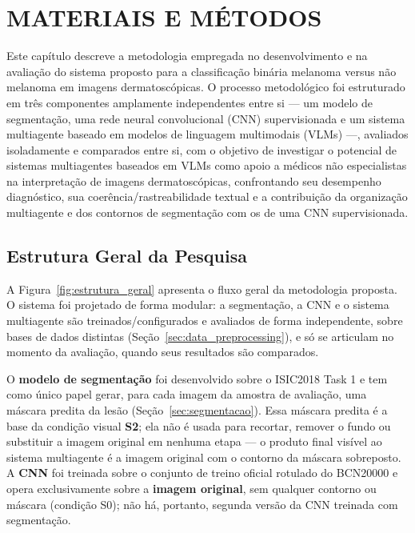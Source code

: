 
\chapter{MATERIAIS E MÉTODOS}

Este capítulo descreve a metodologia empregada no desenvolvimento e na avaliação do sistema proposto para a classificação binária melanoma versus não melanoma em imagens dermatoscópicas. O processo metodológico foi estruturado em três componentes amplamente independentes entre si — um modelo de segmentação, uma rede neural convolucional (CNN) supervisionada e um sistema multiagente baseado em modelos de linguagem multimodais (VLMs) —, avaliados isoladamente e comparados entre si, com o objetivo de investigar o potencial de sistemas multiagentes baseados em VLMs como apoio a médicos não especialistas na interpretação de imagens dermatoscópicas, confrontando seu desempenho diagnóstico, sua coerência/rastreabilidade textual e a contribuição da organização multiagente e dos contornos de segmentação com os de uma CNN supervisionada.

\section{Estrutura Geral da Pesquisa}

A Figura~\ref{fig:estrutura_geral} apresenta o fluxo geral da metodologia proposta. O sistema foi projetado de forma modular: a segmentação, a CNN e o sistema multiagente são treinados/configurados e avaliados de forma independente, sobre bases de dados distintas (Seção~\ref{sec:data_preprocessing}), e só se articulam no momento da avaliação, quando seus resultados são comparados.

O \textbf{modelo de segmentação} foi desenvolvido sobre o ISIC2018 Task 1 e tem como único papel gerar, para cada imagem da amostra de avaliação, uma máscara predita da lesão (Seção~\ref{sec:segmentacao}). Essa máscara predita é a base da condição visual \textbf{S2}; ela não é usada para recortar, remover o fundo ou substituir a imagem original em nenhuma etapa — o produto final visível ao sistema multiagente é a imagem original com o contorno da máscara sobreposto. A \textbf{CNN} foi treinada sobre o conjunto de treino oficial rotulado do BCN20000 e opera exclusivamente sobre a \textbf{imagem original}, sem qualquer contorno ou máscara (condição S0); não há, portanto, segunda versão da CNN treinada com segmentação.

